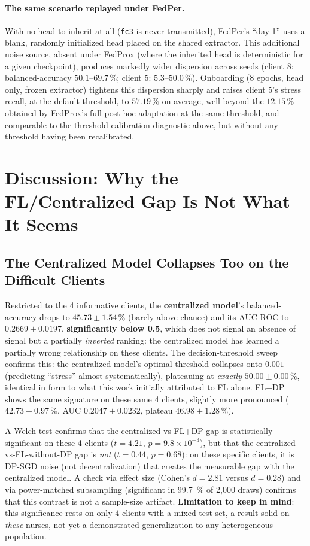\documentclass{acmart}
\begin{document}
\paragraph{The same scenario replayed under FedPer.} With no head to inherit at all
(\texttt{fc3} is never transmitted), FedPer's ``day 1'' uses a blank, randomly
initialized head placed on the shared extractor. This additional noise source, absent
under FedProx (where the inherited head is deterministic for a given checkpoint),
produces markedly wider dispersion across seeds (client 8: balanced-accuracy
$50.1$--$69.7\,\%$; client 5: $5.3$--$50.0\,\%$). Onboarding (8 epochs, head only,
frozen extractor) tightens this dispersion sharply and raises client 5's stress
recall, at the default threshold, to $57.19\,\%$ on average, well beyond the
$12.15\,\%$ obtained by FedProx's full post-hoc adaptation at the same threshold, and
comparable to the threshold-calibration diagnostic above, but without any threshold
having been recalibrated.

\section{Discussion: Why the FL/Centralized Gap Is Not What It Seems}
\label{sec:discussion}

\subsection{The Centralized Model Collapses Too on the Difficult Clients}
\label{subsec:collapse}

Restricted to the 4 informative clients, the \textbf{centralized model}'s
balanced-accuracy drops to $45.73\pm1.54\,\%$ (barely above chance) and its AUC-ROC to
$0.2669\pm0.0197$, \textbf{significantly below 0.5}, which does not signal an absence
of signal but a partially \emph{inverted} ranking: the centralized model has learned a
partially wrong relationship on these clients. The decision-threshold sweep confirms
this: the centralized model's optimal threshold collapses onto $0.001$ (predicting
``stress'' almost systematically), plateauing at \emph{exactly} $50.00\pm0.00\,\%$,
identical in form to what this work initially attributed to FL alone. FL+DP shows the
same signature on these same 4 clients, slightly more pronounced
($42.73\pm0.97\,\%$, AUC $0.2047\pm0.0232$, plateau $46.98\pm1.28\,\%$).

A Welch test confirms that the centralized-vs-FL+DP gap is statistically significant
on these 4 clients ($t=4.21$, $p=9.8\times10^{-3}$), but that the
centralized-vs-FL-without-DP gap is \emph{not} ($t=0.44$, $p=0.68$): on these
specific clients, it is DP-SGD noise (not decentralization) that creates the
measurable gap with the centralized model. A check via effect size (Cohen's
$d=2.81$ versus $d=0.28$) and via power-matched subsampling (significant in 99.7~\%
of 2,000 draws) confirms that this contrast is not a sample-size artifact.
\textbf{Limitation to keep in mind}: this significance rests on only 4 clients with a
mixed test set, a result solid on \emph{these} nurses, not yet a demonstrated
generalization to any heterogeneous population.
\end{document}
